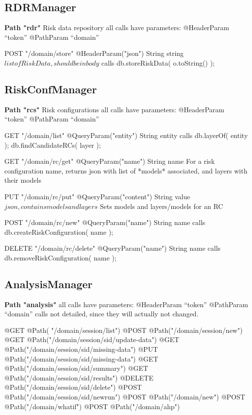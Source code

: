 \subsection{RDRManager}
   
\textbf{Path "rdr"} Risk data repository
all calls have parameters: 
    @HeaderParam ``token''
    @PathParam ``domain''

	POST "/{domain}/store"
	@HeaderParam("json") String string $list of RiskData, should be in body$
	calls db.storeRiskData( o.toString() );
	
\subsection{RiskConfManager}
   
\textbf{Path "rcs"} Risk configurations
all calls have parameters: 
    @HeaderParam ``token''
    @PathParam ``domain''
	
	GET "/{domain}/list"
	@QueryParam("entity") String entity
	calls db.layerOf( entity ); db.findCandidateRCs( layer );
	
	GET "/{domain}/rc/get"
	@QueryParam("name") String name
	For a risk configuration name, returns json with list of *models* associated, and layers with their models
	
	PUT "/{domain}/rc/put"
	@QueryParam("content") String value $json, contains models and layers$
	Sets models and layers/models for an RC
	
	POST "/{domain}/rc/new"
	@QueryParam("name") String name 
	calls db.createRiskConfiguration( name );
	
	DELETE "/{domain}/rc/delete"
	@QueryParam("name") String name 
	calls db.removeRiskConfiguration( name );
	
	
\subsection{AnalysisManager}
   
\textbf{Path "analysis"}
all calls have parameters: 
    @HeaderParam ``token''	
    @PathParam ``domain''
 calls not detailed, since they will actually not changed.  
   
    @GET @Path( "/{domain}/session/list")
    @POST @Path("/{domain}/session/new")
    @GET @Path("/{domain}/session/{sid}/update-data")
	@GET @Path("/{domain}/session/{sid}/missing-data")
	@PUT @Path("/{domain}/session/{sid}/missing-data")
	@GET @Path("/{domain}/session/{sid}/summary")
	@GET @Path("/{domain}/session/{sid}/results")
	@DELETE @Path("/{domain}/session/{sid}/delete")
	@POST @Path("/{domain}/session/{sid}/newrun")
	@POST @Path("/{domain}/new")
	@POST @Path("/{domain}/whatif")
	@POST @Path("/{domain}/ahp")

